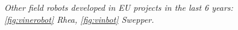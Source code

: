 \begin{figure}
	\centering
	\qquad
	\caption{\textit{Other field robots developed in EU projects in the last 6 years: \ref{fig:vinerobot} Rhea, \ref{fig:vinbot} Swepper.}}
\end{figure}

